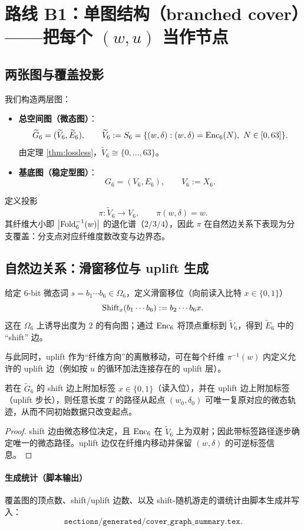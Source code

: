 \section{路线 B1：单图结构（branched cover）——把每个 $(w,u)$ 当作节点}\label{sec:cover}

\subsection{两张图与覆盖投影}
我们构造两层图：
\begin{itemize}
  \item \textbf{总空间图（微态图）}：
  \[
    \widetilde G_6=(\widetilde V_6,\widetilde E_6),\qquad \widetilde V_6:=S_6=\{(w,\delta): (w,\delta)=\Enc_6(N),\ N\in[0,63]\}.
  \]
  由定理 \ref{thm:lossless}，$\widetilde V_6\cong \{0,\dots,63\}$。
  \item \textbf{基底图（稳定型图）}：
  \[
    G_6=(V_6,E_6),\qquad V_6:=X_6.
  \]
\end{itemize}
定义投影
\[
  \pi:\widetilde V_6\to V_6,\qquad \pi(w,\delta)=w.
\]
其纤维大小即 $\left\lvert \mathrm{Fold}_6^{-1}(w)\right\rvert$ 的退化谱（$2/3/4$），因此 $\pi$ 在自然边关系下表现为分支覆盖：分支点对应纤维度数改变与边界态。

\subsection{自然边关系：滑窗移位与 uplift 生成}
给定 $6$-bit 微态词 $s=b_1\cdots b_6\in\Omega_6$，定义滑窗移位（向前读入比特 $x\in\{0,1\}$）
\[
  \mathrm{Shift}_x(b_1\cdots b_6):=b_2\cdots b_6x.
\]
这在 $\Omega_6$ 上诱导出度为 $2$ 的有向图；通过 $\mathrm{Enc}_6$ 将顶点重标到 $\widetilde V_6$，得到 $\widetilde E_6$ 中的 ``shift'' 边。

与此同时，uplift 作为“纤维方向”的离散移动，可在每个纤维 $\pi^{-1}(w)$ 内定义允许的 uplift 边（例如按 $u$ 的循环加法连接存在的 uplift 层）。

\begin{proposition}[无损性以带标签覆盖表达]\label{prop:cover-lossless}
若在 $\widetilde G_6$ 的 shift 边上附加标签 $x\in\{0,1\}$（读入位），并在 uplift 边上附加标签（uplift 步长），则任意长度 $T$ 的路径从起点 $(w_0,\delta_0)$ 可唯一复原对应的微态轨迹，从而不同初始数据只改变起点。
\end{proposition}
\begin{proof}
shift 边由微态移位决定，且 $\mathrm{Enc}_6$ 在 $\widetilde V_6$ 上为双射；因此带标签路径逐步确定唯一的微态路径。uplift 边仅在纤维内移动并保留 $(w,\delta)$ 的可逆标签信息。
\end{proof}

\paragraph{生成统计（脚本输出）}
覆盖图的顶点数、shift/uplift 边数、以及 shift-随机游走的谱统计由脚本生成并写入：
\[
  \texttt{sections/generated/cover\_graph\_summary.tex}.
\]

